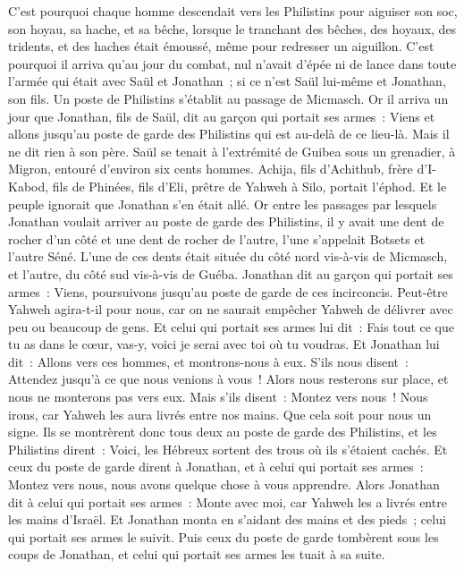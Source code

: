 \begin{multicols}{2}
C'est pourquoi chaque homme descendait vers les Philistins pour aiguiser son soc, son hoyau, sa hache, et sa bêche,
lorsque le tranchant des bêches, des hoyaux, des tridents, et des haches était émoussé, même pour redresser un aiguillon.
C'est pourquoi il arriva qu'au jour du combat, nul n'avait d'épée ni de lance dans toute l'armée qui était avec Saül et Jonathan~; si ce n'est Saül lui-même et Jonathan, son fils.
Un poste de Philistins s'établit au passage de Micmasch.
\VerseOne{}Or il arriva un jour que Jonathan, fils de Saül, dit au garçon qui portait ses armes~: Viens et allons jusqu'au poste de garde des Philistins qui est au-delà de ce lieu-là. Mais il ne dit rien à son père.
Saül se tenait à l'extrémité de Guibea sous un grenadier, à Migron, entouré d'environ six cents hommes.
Achija, fils d'Achithub, frère d'I-Kabod, fils de Phinées, fils d'Eli, prêtre de Yahweh à Silo, portait l'éphod. Et le peuple ignorait que Jonathan s'en était allé.
Or entre les passages par lesquels Jonathan voulait arriver au poste de garde des Philistins, il y avait une dent de rocher d'un côté et une dent de rocher de l'autre, l'une s'appelait Botsets et l'autre Séné.
L'une de ces dents était située du côté nord vis-à-vis de Micmasch, et l'autre, du côté sud vis-à-vis de Guéba.
Jonathan dit au garçon qui portait ses armes~: Viens, poursuivons jusqu'au poste de garde de ces incirconcis. Peut-être Yahweh agira-t-il pour nous, car on ne saurait empêcher Yahweh de délivrer avec peu ou beaucoup de gens.
Et celui qui portait ses armes lui dit~: Fais tout ce que tu as dans le cœur, vas-y, voici je serai avec toi où tu voudras.
Et Jonathan lui dit~: Allons vers ces hommes, et montrons-nous à eux.
S'ils nous disent~: Attendez jusqu'à ce que nous venions à vous~! Alors nous resterons sur place, et nous ne monterons pas vers eux.
Mais s'ils disent~: Montez vers nous~! Nous irons, car Yahweh les aura livrés entre nos mains. Que cela soit pour nous un signe.
Ils se montrèrent donc tous deux au poste de garde des Philistins, et les Philistins dirent~: Voici, les Hébreux sortent des trous où ils s'étaient cachés.
Et ceux du poste de garde dirent à Jonathan, et à celui qui portait ses armes~: Montez vers nous, nous avons quelque chose à vous apprendre. Alors Jonathan dit à celui qui portait ses armes~: Monte avec moi, car Yahweh les a livrés entre les mains d'Israël.
Et Jonathan monta en s'aidant des mains et des pieds~; celui qui portait ses armes le suivit. Puis ceux du poste de garde tombèrent sous les coups de Jonathan, et celui qui portait ses armes les tuait à sa suite.

\end{multicols}
